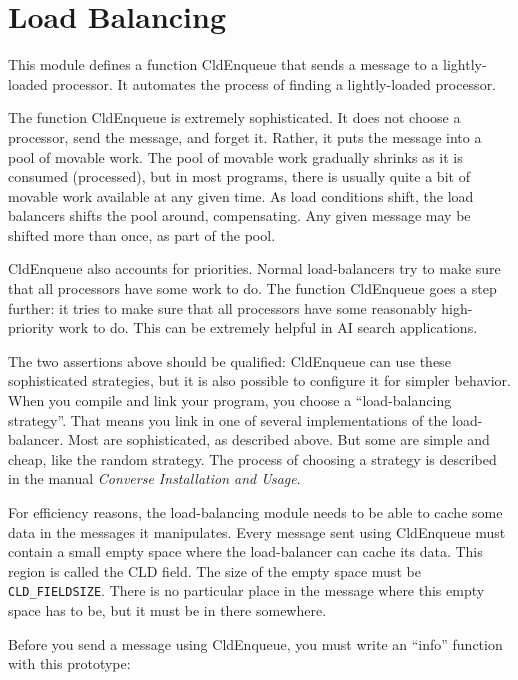 \chapter{Load Balancing}

This module defines a function CldEnqueue that sends a message
to a lightly-loaded processor.  It automates the process of finding a
lightly-loaded processor.  

The function CldEnqueue is extremely sophisticated.  It does not
choose a processor, send the message, and forget it.  Rather, it puts
the message into a pool of movable work.  The pool of movable work
gradually shrinks as it is consumed (processed), but in most programs,
there is usually quite a bit of movable work available at any given
time.  As load conditions shift, the load balancers shifts the pool
around, compensating.  Any given message may be shifted more than
once, as part of the pool.

CldEnqueue also accounts for priorities.  Normal load-balancers
try to make sure that all processors have some work to do.  The
function CldEnqueue goes a step further: it tries to make sure
that all processors have some reasonably high-priority work to do.
This can be extremely helpful in AI search applications.

The two assertions above should be qualified: CldEnqueue can use
these sophisticated strategies, but it is also possible to configure
it for simpler behavior.  When you compile and link your program, you
choose a ``load-balancing strategy''.  That means you link in one of
several implementations of the load-balancer.  Most are sophisticated,
as described above.  But some are simple and cheap, like the random
strategy.  The process of choosing a strategy is described in the
manual {\em Converse Installation and Usage}.

For efficiency reasons, the load-balancing module needs to be able to
cache some data in the messages it manipulates.  Every message sent
using CldEnqueue must contain a small empty space where the
load-balancer can cache its data.  This region is called the CLD
field.  The size of the empty space must be {\tt CLD\_FIELDSIZE}.
There is no particular place in the message where this empty space has
to be, but it must be in there somewhere.

Before you send a message using CldEnqueue, you must write an
``info'' function with this prototype:


